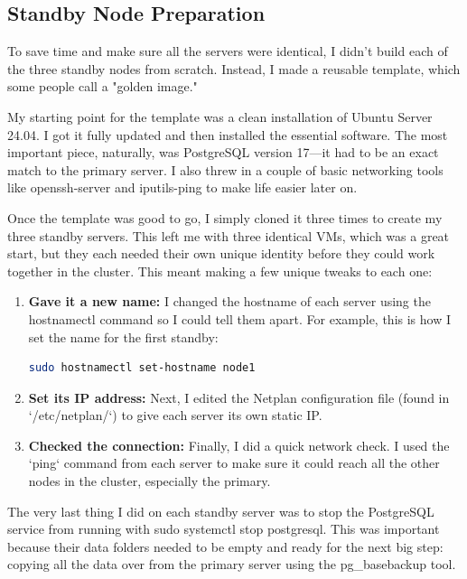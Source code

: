 \documentclass[conference]{IEEEtran}
\begin{document}
\subsection{Standby Node Preparation}
To save time and make sure all the servers were identical, I didn't build each of the three standby nodes from scratch. Instead, I made a reusable template, which some people call a "golden image."

My starting point for the template was a clean installation of Ubuntu Server 24.04. I got it fully updated and then installed the essential software. The most important piece, naturally, was PostgreSQL version 17—it had to be an exact match to the primary server. I also threw in a couple of basic networking tools like openssh-server and iputils-ping to make life easier later on.

Once the template was good to go, I simply cloned it three times to create my three standby servers. This left me with three identical VMs, which was a great start, but they each needed their own unique identity before they could work together in the cluster. This meant making a few unique tweaks to each one:



\begin{enumerate}
\item \textbf{Gave it a new name:} I changed the hostname of each server using the hostnamectl command so I could tell them apart. For example, this is how I set the name for the first standby:
\begin{lstlisting}[language=bash, caption={Setting the hostname for node1}]
sudo hostnamectl set-hostname node1
\end{lstlisting}

\item \textbf{Set its IP address:} Next, I edited the Netplan configuration file (found in `/etc/netplan/`) to give each server its own static IP.

\item \textbf{Checked the connection:} Finally, I did a quick network check. I used the `ping` command from each server to make sure it could reach all the other nodes in the cluster, especially the primary.

\end{enumerate}

The very last thing I did on each standby server was to stop the PostgreSQL service from running with sudo systemctl stop postgresql. This was important because their data folders needed to be empty and ready for the next big step: copying all the data over from the primary server using the pg\_basebackup tool.
\end{document}
